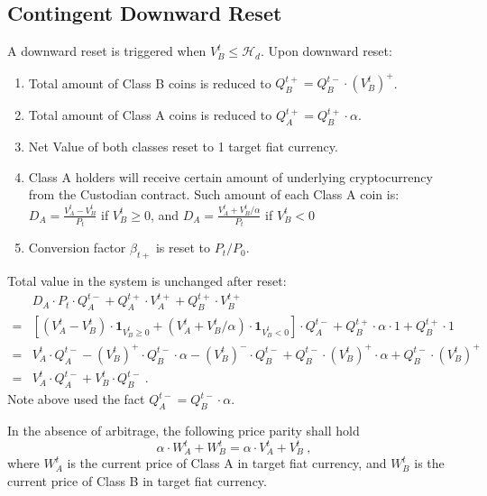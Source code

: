 \documentclass[draft, noinfoline]{ectaart}
\numberwithin{equation}{section}
\theoremstyle{plain}
\begin{document}
\begin{appendices}
\subsection{Contingent Downward Reset\label{subsec:Contingent-Downward-Reset}}

A downward reset is triggered when $V_{B}^{t}\leqslant\mathcal{H}_{d}$. Upon downward reset:
\begin{enumerate}
\item Total amount of Class B coins is reduced to $Q_{B}^{t+}=Q_{B}^{t-}\cdot (V_{B}^{t})^+$.
\item Total amount of Class A coins is reduced to $Q_{A}^{t+}=Q_{B}^{t+}\cdot\alpha$.
\item Net Value of both classes reset to 1 target fiat currency.
\item Class A holders will receive certain amount of underlying cryptocurrency from the Custodian contract. Such amount of each Class A coin is: $D_{A}=\frac{V_{A}^{t}-V_{B}^{t}}{P_{t}}$ if $V_B^t\ge 0$, and $D_{A}=\frac{V_{A}^{t}+V_{B}^{t}/\alpha}{P_{t}}$ if $V_B^t< 0$
\item Conversion factor $\beta_{t+}$ is reset to $P_t/P_0$.
\end{enumerate}
Total value in the system is unchanged after reset:
\begin{align*}
 & D_{A}\cdot P_{t}\cdot Q_{A}^{t-}+Q_{A}^{t+}\cdot V_{A}^{t+}+Q_{B}^{t+}\cdot V_{B}^{t+}\\
= & \left[\left(V_{A}^{t}-V_{B}^{t}\right)\cdot\mathbf{1}_{V_B^t\ge 0}+\left(V_{A}^{t}+V_{B}^{t}/\alpha\right)\cdot\mathbf{1}_{V_B^t< 0}\right]\cdot Q_{A}^{t-}+Q_{B}^{t+}\cdot\alpha\cdot1+Q_{B}^{t+}\cdot1\\
= & V_{A}^{t}\cdot Q_{A}^{t-}-(V_{B}^{t})^+\cdot Q_{B}^{t-}\cdot\alpha-(V_{B}^{t})^-\cdot Q_{B}^{t-}+Q_{B}^{t-}\cdot (V_{B}^{t})^+\cdot\alpha+Q_{B}^{t-}\cdot (V_{B}^{t})^+\\
= & V_{A}^{t}\cdot Q_{A}^{t-}+V_{B}^{t}\cdot Q_{B}^{t-}\ .
\end{align*}
Note above used the fact $Q_{A}^{t-}=Q_{B}^{t-}\cdot\alpha$.




In the absence of arbitrage, the following price parity shall hold
\[
\alpha\cdot W_{A}^{t}+W_{B}^{t}=\alpha\cdot V_{A}^{t}+V_{B}^{t}\ ,
\]
where $W_{A}^{t}$ is the current price of Class A in target fiat currency, and $W_{B}^{t}$ is the current price of Class B in target fiat currency.


\end{appendices}
\end{document}
